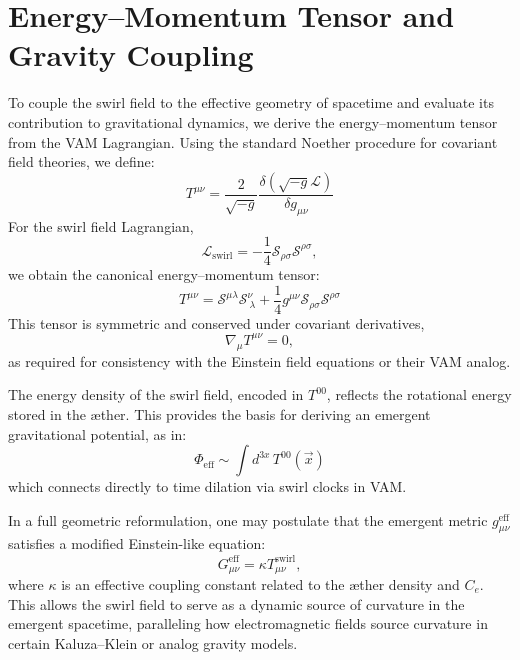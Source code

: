 \section{Energy--Momentum Tensor and Gravity Coupling}
To couple the swirl field to the effective geometry of spacetime and evaluate its contribution to gravitational dynamics, we derive the energy--momentum tensor from the VAM Lagrangian. Using the standard Noether procedure for covariant field theories, we define:
\begin{equation}
    T^{\mu\nu} = \frac{2}{\sqrt{-g}} \frac{\delta (\sqrt{-g} \mathcal{L})}{\delta g_{\mu\nu}}
\end{equation}
For the swirl field Lagrangian,
\begin{equation}
    \mathcal{L}_{\text{swirl}} = -\frac{1}{4} \mathcal{S}_{\rho\sigma} \mathcal{S}^{\rho\sigma},
\end{equation}
we obtain the canonical energy--momentum tensor:
\begin{equation}
    T^{\mu\nu} = \mathcal{S}^{\mu\lambda} \mathcal{S}^\nu_{\ \lambda} + \frac{1}{4} g^{\mu\nu} \mathcal{S}_{\rho\sigma} \mathcal{S}^{\rho\sigma}
\end{equation}
This tensor is symmetric and conserved under covariant derivatives,
\begin{equation}
    \nabla_\mu T^{\mu\nu} = 0,
\end{equation}
as required for consistency with the Einstein field equations or their VAM analog.

The energy density of the swirl field, encoded in $T^{00}$, reflects the rotational energy stored in the æther. This provides the basis for deriving an emergent gravitational potential, as in:
\begin{equation}
    \Phi_{\text{eff}} \sim \int d^{3x} \, T^{00}(\vec{x})
\end{equation}
which connects directly to time dilation via swirl clocks in VAM.

In a full geometric reformulation, one may postulate that the emergent metric $g^{\text{eff}}_{\mu\nu}$ satisfies a modified Einstein-like equation:
\begin{equation}
    G_{\mu\nu}^{\text{eff}} = \kappa T_{\mu\nu}^{\text{swirl}},
\end{equation}
where $\kappa$ is an effective coupling constant related to the æther density and $C_e$. This allows the swirl field to serve as a dynamic source of curvature in the emergent spacetime, paralleling how electromagnetic fields source curvature in certain Kaluza--Klein or analog gravity models.

